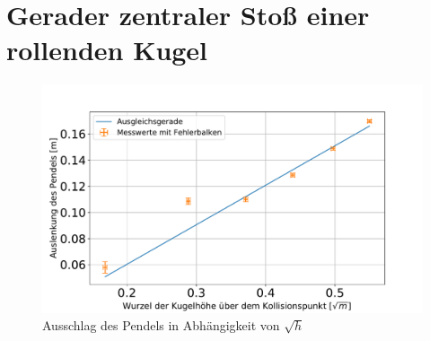 \section[Rollende Kugel]{Gerader zentraler Stoß einer rollenden Kugel}\label{kap:roll}



\begin{figure}[h!]
	\centering
	\includegraphics[width=0.7\linewidth]{res/Rinne}
	\caption{Ausschlag des Pendels in Abhängigkeit von $\sqrt{h}$}
	\label{fig:rinne}
\end{figure}

